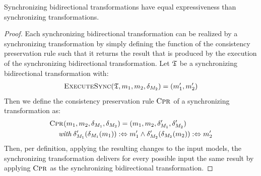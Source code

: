 \begin{theorem}
    Synchronizing bidirectional transformations have equal expressiveness than synchronizing transformations.
\end{theorem}
\begin{proof}
    Each synchronizing bidirectional transformation can be realized by a synchronizing transformation by simply defining the function of the consistency preservation rule such that it returns the result that is produced by the execution of the synchronizing bidirectional transformation.
    Let $\mathfrak{T}$ be a synchronizing bidirectional transformation with:
    \begin{align*}
        \textsc{ExecuteSync}(\mathfrak{T}, m_{1}, m_{2}, \delta_{M_{2}}) = (m_{1}', m_{2}')
    \end{align*}
    Then we define the consistency preservation rule $\textsc{Cpr}_{}$ of a synchronizing transformation as:
    \begin{align*}
        &
        \textsc{Cpr}_{}(m_{1}, m_{2}, \delta_{M_{1}}, \delta_{M_{2}}) = (m_{1}, m_{2}, \delta_{M_{1}}', \delta_{M_{2}}') \\
        & \hspace{1em}
        \; \textit{with} \; \delta_{M_{1}}'(\delta_{M_{1}}(m_{1})) :\Leftrightarrow m_{1}' 
        \land \delta_{M_{2}}'(\delta_{M_{2}}(m_{2})) :\Leftrightarrow m_{2}'
    \end{align*}
    Then, per definition, applying the resulting changes to the input models, the synchronizing transformation delivers for every possible input the same result by applying $\textsc{Cpr}_{}$ as the synchronizing bidirectional transformation.


\end{proof}
